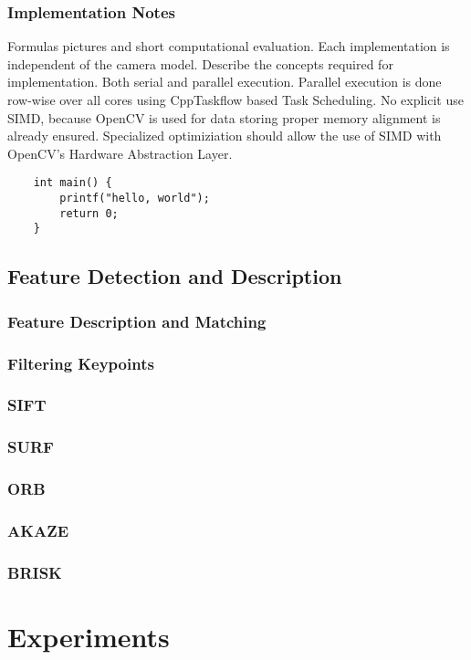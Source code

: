 \subsubsection{Implementation Notes}

Formulas pictures and short computational evaluation.
Each implementation is independent of the camera model.
Describe the concepts required for implementation.
Both serial and parallel execution.
Parallel execution is done row-wise over all cores using CppTaskflow based Task Scheduling.
No explicit use SIMD, because OpenCV\cite{opencv_library} is used for data storing proper memory alignment is already ensured.
Specialized optimiziation should allow the use of SIMD with OpenCV's Hardware Abstraction Layer.

\begin{verbatim}
    int main() {
        printf("hello, world");
        return 0;
    }
\end{verbatim}

\subsection{Feature Detection and Description}
\subsubsection{Feature Description and Matching}
\subsubsection{Filtering Keypoints}
\subsubsection{SIFT}
\subsubsection{SURF}
\subsubsection{ORB}
\subsubsection{AKAZE}
\subsubsection{BRISK}

\section{Experiments}

